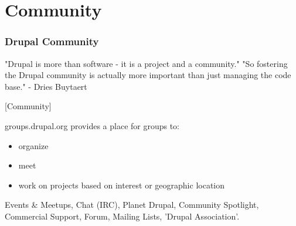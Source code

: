 \section{Community}

\begin{frame}[allowframebreaks]
\frametitle{Drupal Community}

"Drupal is more than software - it is a project and a community."
"So fostering the Drupal community is actually more important than just managing the code base."
- Dries Buytaert

[Community]

groups.drupal.org provides a place for groups to:

    \begin{itemize}
	    \item organize
	    \item meet
	    \item work on projects based on interest or geographic location
	\end{itemize}
	
Events \& Meetups, Chat (IRC), Planet Drupal, Community Spotlight, Commercial Support, Forum, Mailing Lists, 'Drupal Association'.

\end{frame}

